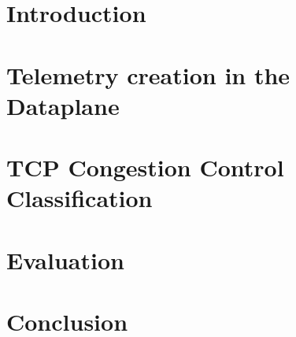 \section{Introduction}\label{sec:introduction}


\section{Telemetry creation in the Dataplane}\label{sec:architecture}


\section{TCP Congestion Control Classification}\label{sec:tcpcc}


\section{Evaluation}\label{sec:evaluation}


% 

\section{Conclusion}\label{sec:conclustion}

